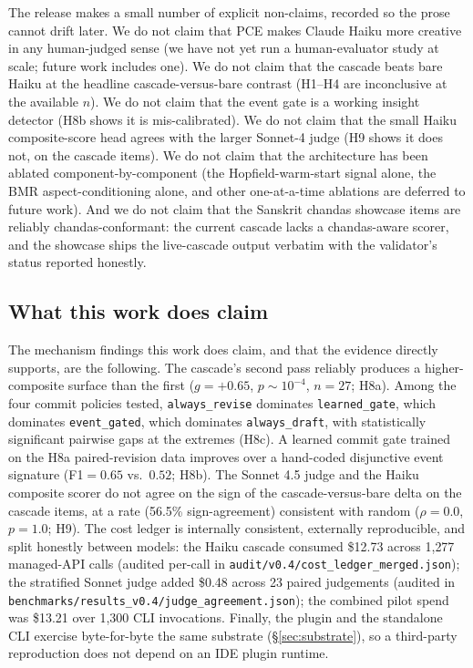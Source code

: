 The release makes a small number of explicit non-claims, recorded so the prose cannot drift later. We do not claim that PCE makes Claude Haiku more creative in any human-judged sense (we have not yet run a human-evaluator study at scale; future work includes one). We do not claim that the cascade beats bare Haiku at the headline cascade-versus-bare contrast (H1--H4 are inconclusive at the available $n$). We do not claim that the  event gate is a working insight detector (H8b shows it is mis-calibrated). We do not claim that the small Haiku composite-score head agrees with the larger Sonnet-4 judge (H9 shows it does not, on the cascade items). We do not claim that the architecture has been ablated component-by-component (the Hopfield-warm-start signal alone, the BMR aspect-conditioning alone, and other one-at-a-time ablations are deferred to future work). And we do not claim that the Sanskrit chandas showcase items are reliably chandas-conformant: the current cascade lacks a chandas-aware scorer, and the showcase ships the live-cascade output verbatim with the validator's status reported honestly.

\subsection{What this work does claim}

The mechanism findings this work does claim, and that the evidence directly supports, are the following. The cascade's second pass reliably produces a higher-composite surface than the first ($g=+0.65$, $p\sim 10^{-4}$, $n=27$; H8a). Among the four commit policies tested, \texttt{always\_revise} dominates \texttt{learned\_gate}, which dominates \texttt{event\_gated}, which dominates \texttt{always\_draft}, with statistically significant pairwise gaps at the extremes (H8c). A learned commit gate trained on the H8a paired-revision data improves over a hand-coded  disjunctive event signature (F1${}=0.65$ vs.\ $0.52$; H8b). The Sonnet 4.5 judge and the Haiku composite scorer do not agree on the sign of the cascade-versus-bare delta on the cascade items, at a rate (56.5\% sign-agreement) consistent with random ($\rho=0.0$, $p=1.0$; H9). The cost ledger is internally consistent, externally reproducible, and split honestly between models: the Haiku cascade consumed \$12.73 across 1{,}277 managed-API calls (audited per-call in \nolinkurl{audit/v0.4/cost_ledger_merged.json}); the stratified Sonnet judge added \$0.48 across 23 paired judgements (audited in \nolinkurl{benchmarks/results_v0.4/judge_agreement.json}); the combined pilot spend was \$13.21 over 1{,}300 CLI invocations. Finally, the plugin and the standalone CLI exercise byte-for-byte the same substrate (\S\ref{sec:substrate}), so a third-party reproduction does not depend on an IDE plugin runtime.

